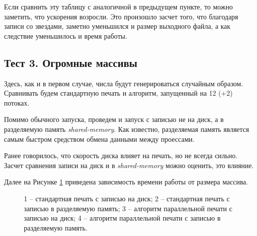 Если сравнить эту таблицу с аналогичной в предыдущем пункте, то можно заметить, что ускорения возросли.
Это произошло засчет того, что благодаря записи со звездами, заметно уменьшился и размер выходного файла, а как следствие уменьшилось и время работы.

\subsection{Тест 3. Огромные массивы} \label{subsec2:3}
Здесь, как и в первом случае, числа будут генерироваться случайным образом.
Сравнивать будем стандартную печать и алгоритм, запущенный на 12 (+2) потоках.

Помимо обычного запуска, проведем и запуск с записью не на диск, а в разделяемую память \textit{shared-memory}.
Как известно, разделяемая память является самым быстром средством обмена данными между проессами.

Ранее говорилось, что скорость диска влияет на печать, но не всегда сильно.
Засчет сравнения записи на диск и в \textit{shared-memory} можно оценить, это влияние.

Далее на Рисунке \ref{grap} приведена зависимость времени работы от размера массива.
\begin{figure}[h!]
\caption{
1 -- стандартная печать с записью на диск;
2 -- стандартная печать с записью в разделяемую память;
3 -- алгоритм параллельной печати с записью на диск;
4 -- алгоритм параллельной печати с записью в разделяемую память.} \label{grap}
\end{figure}

